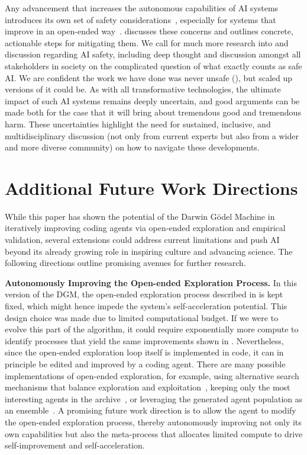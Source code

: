 Any advancement that increases the autonomous capabilities of AI systems introduces its own set of safety considerations~\citep{bengio2024managing}, especially for systems that improve in an open-ended way~\citep{ecoffet2020open, clune2019ai}.  discusses these concerns and outlines concrete, actionable steps for mitigating them. We call for much more research into and discussion regarding AI safety, including deep thought and discussion amongst all stakeholders in society on the complicated question of what exactly counts as safe AI. We are confident the work we have done was never unsafe (), but scaled up versions of it could be. As with all transformative technologies, the ultimate impact of such AI systems remains deeply uncertain, and good arguments can be made both for the case that it will bring about tremendous good and tremendous harm. These uncertainties highlight the need for sustained, inclusive, and multidisciplinary discussion (not only from current experts but also from a wider and more diverse community) on how to navigate these developments.

\section{Additional Future Work Directions}
\label{app:future-work}

While this paper has shown the potential of the Darwin G\"odel Machine in iteratively improving coding agents via open‐ended exploration and empirical validation, several extensions could address current limitations and push AI beyond its already growing role in inspiring culture and advancing science. The following directions outline promising avenues for further research.

\textbf{Autonomously Improving the Open-ended Exploration Process.}
In this version of the DGM, the open-ended exploration process described in  is kept fixed, which might hence impede the system's self-acceleration potential. This design choice was made due to limited computational budget. If we were to evolve this part of the algorithm, it could require exponentially more compute to identify processes that yield the same improvements shown in . Nevertheless, since the open-ended exploration loop itself is implemented in code, it can in principle be edited and improved by a coding agent. There are many possible implementations of open-ended exploration, for example, using alternative search mechanisms that balance exploration and exploitation~\citep{herr2025llm}, keeping only the most interesting agents in the archive~\citep{faldor2025omni}, or leveraging the generated agent population as an ensemble~\citep{samvelyan2024rainbow}. A promising future work direction is to allow the agent to modify the open-ended exploration process, thereby autonomously improving not only its own capabilities but also the meta-process that allocates limited compute to drive self-improvement and self-acceleration.


